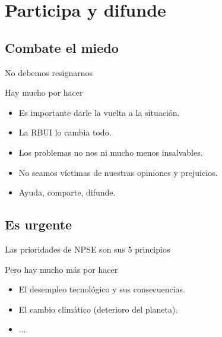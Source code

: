 \documentclass{beamer}
\begin{document}
\section{Participa y difunde}

\subsection{Combate el miedo}

\begin{frame}{No debemos resignarnos}
  \begin{block}{Hay mucho por hacer}
  \begin{itemize}
    \item Es importante darle la vuelta a la situaci\'on.
    \item La RBUI lo cambia todo.
    \item Los problemas no nos ni mucho menos insalvables.
    \item No seamos v\'i{}ctimas de nuestras opiniones y prejuicios.
    \item Ayuda, comparte, difunde.
  \end{itemize}
  \end{block}
\end{frame}

\subsection{Es urgente}

\begin{frame}{Las prioridades de NPSE son sus 5 principios}
  \begin{block}{Pero hay mucho m\'as por hacer}
  \begin{itemize}
    \item El desempleo tecnol\'ogico y sus consecuencias.
    \item El cambio clim\'atico (deterioro del planeta).
    \item ...
  \end{itemize}
  \end{block}
\end{frame}
\end{document}
